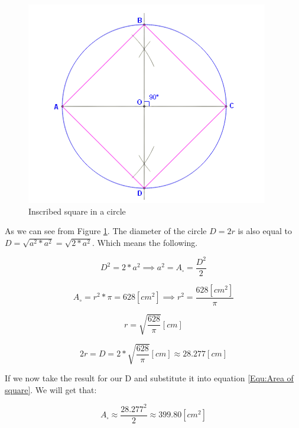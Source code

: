 \documentclass[a4paper, 10pt]{article}
\begin{document}
		\begin{figure}[h]
			\centering
			\includegraphics[scale = .85]{inscribedSquare}
			\caption{Inscribed square in a circle}
			\label{fig:InscribedSquare}
		\end{figure}
	
		\noindent As we can see from Figure \ref{fig:InscribedSquare}. The diameter of the circle $D = 2r$ is also equal to $D = \sqrt{a^2 * a^2} = \sqrt{2*a^2}$. Which means the following.
		
		\begin{equation}
			D^2 = 2*a^2 \implies a^2 = A_\square = \frac{D^2}{2}
			\label{Equ:Area of square}
		\end{equation}

		\begin{equation}
			A_\circ = r^2 * \pi = 628 [cm^2] \implies r^2 = \frac{628 [cm^2]}{\pi}
		\end{equation}
	
		\begin{equation*}
			r = \sqrt{\frac{628}{\pi}} [cm]
		\end{equation*}
	
		\begin{equation*}
			2r = D = 2 * \sqrt{\frac{628}{\pi}} [cm] \approx 28.277 [cm]
		\end{equation*}
	
		\noindent If we now take the result for our D and substitute it into equation \ref{Equ:Area of square}. We will get that:
		
		\begin{equation*}
			A_\square \approx \frac{28.277^2}{2} \approx 399.80 [cm^2]
		\end{equation*}
\end{document}

